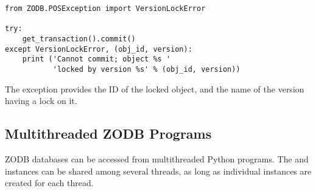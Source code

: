 \begin{verbatim}
from ZODB.POSException import VersionLockError

try:
    get_transaction().commit()
except VersionLockError, (obj_id, version):
    print ('Cannot commit; object %s '
           'locked by version %s' % (obj_id, version))
\end{verbatim}

The exception provides the ID of the locked object, and the name of
the version having a lock on it.

\subsection{Multithreaded ZODB Programs}

ZODB databases can be accessed from multithreaded Python programs.
The  and  instances can be shared among
several threads, as long as individual  instances
are created for each thread.  

